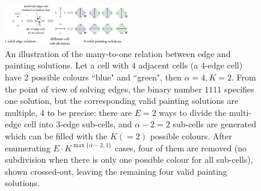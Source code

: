 \documentclass[conference]{IEEEtran}
\begin{document}
\begin{figure}[t]
\centering
\includegraphics[width = 0.48\textwidth]{figures/many_to_one_3}
\caption{An illustration of the many-to-one relation between edge and painting solutions. 
Let a cell with $4$ adjacent cells (a $4$-edge cell) have 2 possible colours ``blue" and ``green", then $\alpha = 4, K = 2$. From the point of view of solving edges, the binary number $1111$ specifies one solution, but the corresponding valid painting solutions are multiple, $4$ to be precise: there are $E=2$ ways to divide the multi-edge cell into $3$-edge sub-cells, and $\alpha-2 = 2$ sub-cells are generated which can be filled with the $K (=2)$ possible colours. After enumerating $E\cdot K^{\max\{\alpha-2, 1\}}$ cases, four of them are removed (no subdivision when there is only one possible colour for all sub-cells), shown crossed-out, leaving the remaining four valid painting solutions.
}
\label{fig:many_to_one}
\end{figure}
\end{document}
